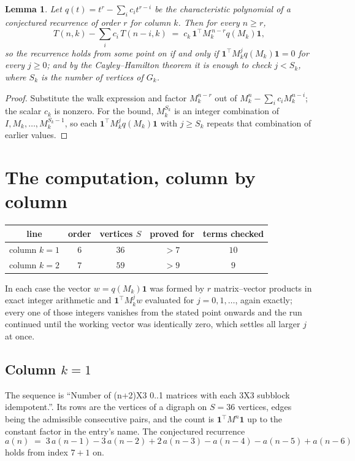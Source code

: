 \documentclass[11pt,a4paper]{article}
\theoremstyle{plain}
\newtheorem{lemma}[theorem]{Lemma}
\theoremstyle{definition}
\begin{document}
\begin{lemma}\label{lem:crit}
Let $q(t)=t^{r}-\sum_i c_it^{r-i}$ be the characteristic polynomial of a conjectured
recurrence of order $r$ for column $k$. Then for every $n\ge r$,
\[
T(n,k)-\sum_i c_i\,T(n-i,k)\;=\;c_k\,\mathbf{1}^{\!\top}M_k^{\,n-r}q(M_k)\mathbf{1},
\]
so the recurrence holds from some point on if and only if
$\mathbf{1}^{\!\top}M_k^{j}q(M_k)\mathbf{1}=0$ for every $j\ge0$; and by the
Cayley--Hamilton theorem it is enough to check $j<S_k$, where $S_k$ is the number of vertices
of $G_k$.
\end{lemma}

\begin{proof}
Substitute the walk expression and factor $M_k^{n-r}$ out of $M_k^{n}-\sum_ic_iM_k^{n-i}$;
the scalar $c_k$ is nonzero. For the bound, $M_k^{S_k}$ is an integer combination of
$I,M_k,\dots,M_k^{S_k-1}$, so each $\mathbf{1}^{\!\top}M_k^{j}q(M_k)\mathbf{1}$ with
$j\ge S_k$ repeats that combination of earlier values.
\end{proof}

\section{The computation, column by column}

\begin{center}
\begin{tabular}{ccccc}
line & order & vertices $S$ & proved for & terms checked \\ \hline
column $k$$=1$ & $6$ & $36$ & $>7$ & $10$ \\
column $k$$=2$ & $7$ & $59$ & $>9$ & $9$ \\
\end{tabular}
\end{center}

In each case the vector $w=q(M_k)\mathbf{1}$ was formed by $r$ matrix--vector products in
exact integer arithmetic and $\mathbf{1}^{\!\top}M_k^{j}w$ evaluated for $j=0,1,\dots$,
again exactly; every one of those integers vanishes from the stated point onwards and the run
continued until the working vector was identically zero, which settles all larger $j$ at once.

\subsection*{Column $k$$=1$}
The sequence is ``Number of (n+2)X3 0..1 matrices with each 3X3 subblock idempotent.''. Its rows are the vertices of a digraph on
$S=36$ vertices, edges being the admissible consecutive pairs, and the count is
$\mathbf{1}^{\!\top}M^{n}\mathbf{1}$ up to the constant factor in the entry's name.
The conjectured recurrence
\[
a(n)\;=\;3\,a(n-1) - 3\,a(n-2) + 2\,a(n-3) - a(n-4) - a(n-5) + a(n-6)
\]
holds from index $7+1$ on.
\end{document}
